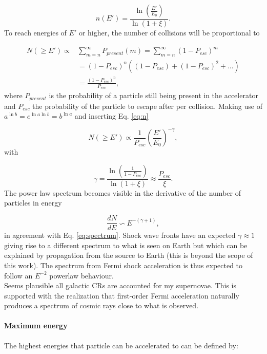 \begin{equation}
\label{eq:n}
n(E') = \frac{\ln \left(\frac{E'}{E_0}\right)}{\ln \left(1+\xi \right)}.
\end{equation}
To reach energies of $E'$ or higher, the number of collisions will be proportional to

\begin{equation}
\begin{split}
N(\geq E') \varpropto &\sum^\infty_{m=n} P_{present}(m) = \sum^\infty_{m=n} \left(1-P_{esc} \right)^m\\
&= (1-P_{esc})^n \left((1 - P_{esc}) + (1 - P_{esc})^2 + ...\right) \\
&= \frac{(1-P_{esc})^n}{P_{esc}},
\end{split}
\end{equation}
where $P_{present}$ is the probability of a particle still being present in the accelerator and $P_{esc}$ the probability of the particle to escape after per collision. Making use of $a^{\ln b} = e^{\ln a \ln b} = b^{\ln a}$ and inserting Eq. \ref{eq:n}

\begin{equation}
N(\geq E') \varpropto \frac{1}{P_{esc}} \left(\frac{E'}{E_0}\right)^{-\gamma},
\end{equation}
with

\begin{equation}
\gamma = \frac{\ln \left(\frac{1}{1-P_{esc}}\right)}{\ln \left(1 + \xi \right)} \approx \frac{P_{esc}}{\xi}.
\end{equation}
The power law spectrum becomes visible in the derivative of the number of particles in energy

\begin{equation}
\frac{dN}{dE} \backsim E^{-(\gamma + 1)},
\end{equation}
in agreement with Eq. \ref{eq:spectrum}. Shock wave fronts have an expected $\gamma \approx 1$ giving rise to a different spectrum to what is seen on Earth but which can be explained by propagation from the source to Earth (this is beyond the scope of this work). The spectrum from Fermi shock acceleration is thus expected to follow an $E^{-2}$ powerlaw behaviour.\\
\newline
Seems plausible all galactic CRs are accounted for my supernovae. This is supported with the realization that first-order Fermi acceleration naturally produces a spectrum of cosmic rays close to what is observed.

\paragraph{Maximum energy}
\label{para:maxenergy}
The highest energies that particle can be accelerated to can be defined by:

